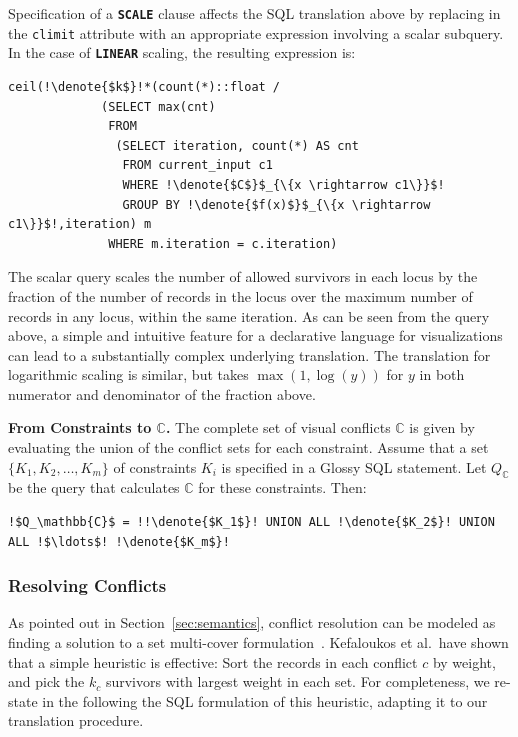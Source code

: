 \documentclass[11pt, oneside]{report}
\newcommand{\minisec}[1]{\noindent\textbf{#1.}}
\newcommand{\denote}[1]{\text{$[\![ $#1$ ]\!]$}}
\begin{document}
{Specification of a \textbf{\texttt{SCALE}} clause affects the SQL translation above by replacing \denote{$k$} in the \texttt{climit} attribute with an appropriate expression involving a scalar subquery. In the case of \textbf{\texttt{LINEAR}} scaling, the resulting expression is:

\begin{lstlisting}[mathescape,escapechar=!]
  ceil(!\denote{$k$}!*(count(*)::float / 
             (SELECT max(cnt)
              FROM 
               (SELECT iteration, count(*) AS cnt 
                FROM current_input c1
                WHERE !\denote{$C$}$_{\{x \rightarrow c1\}}$!
                GROUP BY !\denote{$f(x)$}$_{\{x \rightarrow c1\}}$!,iteration) m              
              WHERE m.iteration = c.iteration)           
\end{lstlisting} 


The scalar query scales the number of allowed survivors in each locus by the fraction of the number of records in the locus over the maximum number of records in any locus, within the same iteration. As can be seen from the query above, a simple and intuitive feature for a declarative language for visualizations can lead to a substantially complex underlying translation. The translation for logarithmic scaling is similar, but takes $\max(1,\log(y))$ for $y$ in both numerator and denominator of the fraction above. 

\minisec{From Constraints to $\mathbb{C}$}
The complete set of visual conflicts $\mathbb{C}$ is given by evaluating the union of the conflict sets for each constraint. Assume that a set $\{K_1, K_2, \ldots, K_m\}$ of constraints $K_i$ is specified in a Glossy SQL statement. Let $Q_\mathbb{C}$ be the query that calculates $\mathbb{C}$ for these constraints. Then:

\begin{lstlisting}[escapechar=\!]  
   !$Q_\mathbb{C}$ = !!\denote{$K_1$}! UNION ALL !\denote{$K_2$}! UNION ALL !$\ldots$! !\denote{$K_m$}! 
\end{lstlisting} 

\subsubsection{Resolving Conflicts}
\label{sec:resolve:conflicts}  

As pointed out in Section~\ref{sec:semantics}, conflict resolution can be modeled as finding a solution to a set multi-cover formulation~\cite{kefaloukos2014declarative}. Kefaloukos et al.~have shown that a simple heuristic is effective: Sort the records in each conflict $c$ by weight, and pick the $k_c$ survivors with largest weight in each set. For completeness, we re-state in the following the SQL formulation of this heuristic, adapting it to our translation procedure.

}
\end{document}
